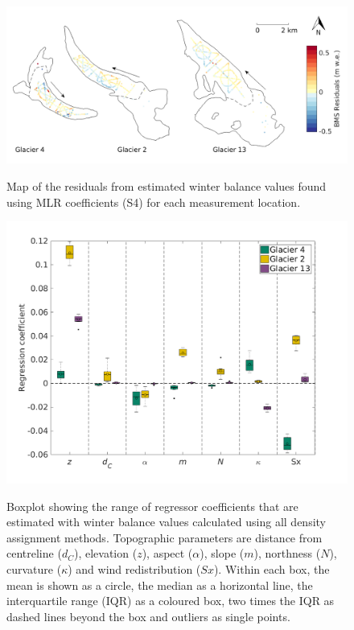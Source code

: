 \documentclass{sfuthesis}
\newcommand{\params}{Topographic parameters are distance from centreline ($d_C$), elevation ($z$), aspect ($\alpha$), slope ($m$), northness ($N$), curvature ($\kappa$) and wind redistribution ($Sx$). }
\newcommand{\boxplot}{Within each box, the mean is shown as a circle, the median as a horizontal line, the interquartile range (IQR) as a coloured box, two times the IQR as dashed lines beyond the box and outliers as single points. }
\begin{document}
\begin{figure}
	\centering
	\includegraphics[width =\textwidth]{residualsMap_MLR.png}\\
	\caption{Map of the residuals from estimated winter balance values found using MLR coefficients (S4) for each measurement location.}
	\label{fig:MLR_residualsMap}
\end{figure} 

\begin{figure}
	\centering
	\includegraphics[width =1\textwidth]{MLRcoeff_DensityOpts.png}\\
	\caption{Boxplot showing the range of regressor coefficients that are estimated with winter balance values calculated using all density assignment methods. \params \boxplot }
	\label{fig:MLRcoeff_densityOptions}
\end{figure}
\end{document}
